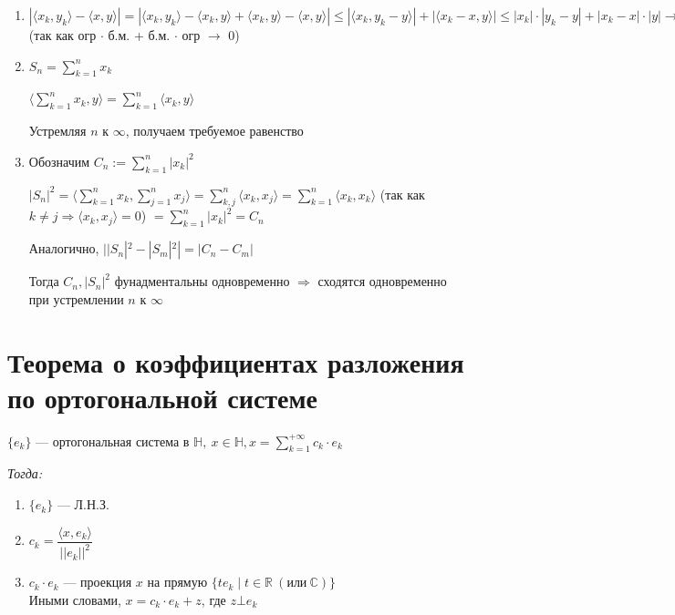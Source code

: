 \documentclass[paper=a4, fontsize=17pt]{article}
\begin{document}
\begin{enumerate}
	\item $|\langle x_k, y_k \rangle - \langle x, y \rangle| = |\langle x_k, y_k \rangle - \langle x_k, y\rangle  + \langle x_k, y\rangle  - \langle x, y\rangle | \leqslant |\langle x_k, y_k - y\rangle | + |\langle x_k - x, y\rangle | \leqslant |x_k| \cdot |y_k - y| + |x_k - x| \cdot |y| \rightarrow 0$ (так как огр $\cdot$ б.м. +  б.м. $\cdot$ огр $\rightarrow$ 0)

	\item $S_n = \sum\limits_{k = 1}^{n} x_k$

	$\langle \sum\limits_{k = 1}^n x_k, y\rangle  = \sum\limits_{k = 1}^n \langle x_k, y\rangle $

	Устремляя $n$ к $\infty$, получаем требуемое равенство

	\item Обозначим $C_n := \sum\limits_{k = 1}^n |x_k|^2$

	 $|S_n|^2 = \langle \sum\limits_{k = 1}^n x_k, \sum\limits_{j = 1}^n x_j\rangle  = \sum\limits_{k, j}^n \langle x_k, x_j\rangle  = \sum\limits_{k = 1}^n \langle x_k, x_k\rangle $ (так как $k \neq j \Rightarrow \langle x_k, x_j\rangle  = 0$) $= \sum\limits_{k = 1}^n |x_k|^2 = C_n$

	 Аналогично, $||S_n|^2 - |S_m|^2| = |C_n - C_m|$

	 Тогда $C_n, |S_n|^2$ фунадментальны одновременно $\Rightarrow$ сходятся одновременно при устремлении $n$ к $\infty$
\end{enumerate}

\section{Теорема о коэффициентах разложения по ортогональной системе}

$\{e_k\}$ {{---}} ортогональная система в $\mathds{H},\ x \in \mathds{H}, x = \sum\limits_{k=1}^{+\infty} c_k \cdot e_k$

\emph{Тогда:}
\begin{enumerate}

	\item $\{e_k\}$ {{---}} Л.Н.З.

	\item $c_k = \dfrac{\langle x, e_k \rangle}{||e_k||^2}$

	\item $c_k \cdot e_k$ {{---}} проекция $x$ на прямую $\{te_k \mid t \in \mathbb{R}\ (\text{или}\ \mathbb{C})\}$\\
	Иными словами, $x = c_k \cdot e_k + z$, где $z \bot e_k$

\end{enumerate}
\end{document}
